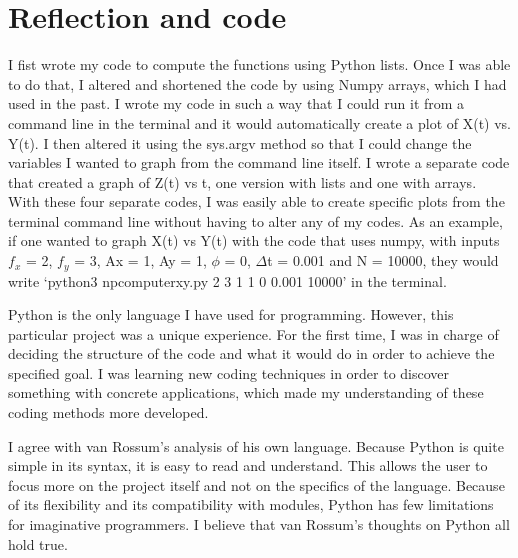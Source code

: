 \documentclass{article}
\begin{document}
\section{Reflection and code}


I fist wrote my code to compute the functions using Python lists. Once I was able to do that, I altered and shortened the code by using Numpy arrays, which I had used in the past. I wrote my code in such a way that I could run it from a command line in the terminal and it would automatically create a plot of X(t) vs. Y(t). I then altered it using the sys.argv method so that I could change the variables I wanted to graph from the command line itself. I wrote a separate code that created a graph of Z(t) vs t, one version with lists and one with arrays. With these four separate codes, I was easily able to create specific plots from the terminal command line without having to alter any of my codes. As an example, if one wanted to graph X(t) vs Y(t) with the code that uses numpy, with inputs $f_x$ = 2, $f_y$ = 3, Ax = 1, Ay = 1, $\phi$ = 0, $\Delta$t = 0.001 and N = 10000, they would write `python3 npcomputerxy.py 2 3 1 1 0 0.001 10000' in the terminal. 

Python is the only language I have used for programming. However, this particular project was a unique experience. For the first time, I was in charge of deciding the structure of the code and what it would do in order to achieve the specified goal. I was learning new coding techniques in order to discover something with concrete applications, which made my understanding of these coding methods more developed. 

I agree with van Rossum's analysis of his own language. Because Python is quite simple in its syntax, it is easy to read and understand. This allows the user to focus more on the project itself and not on the specifics of the language. Because of its flexibility and its compatibility with modules, Python has few limitations for imaginative programmers. I believe that van Rossum's thoughts on Python all hold true. 
\end{document}
